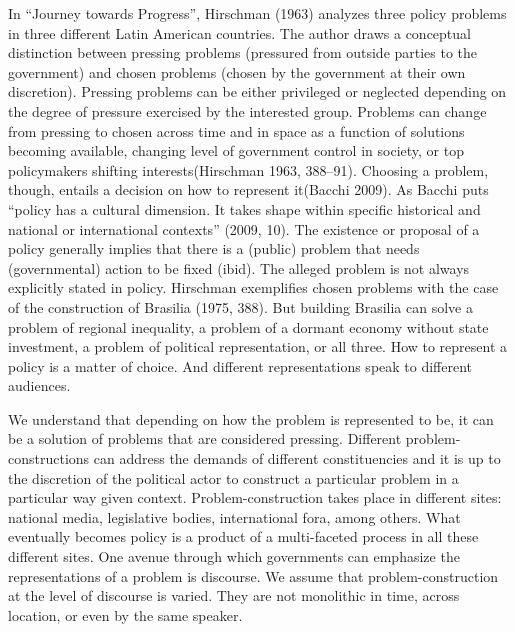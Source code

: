 \documentclass[
]{article}
\begin{document}
In ``Journey towards Progress'', Hirschman (1963) analyzes three policy
problems in three different Latin American countries. The author draws a
conceptual distinction between pressing problems (pressured from outside
parties to the government) and chosen problems (chosen by the government
at their own discretion). Pressing problems can be either privileged or
neglected depending on the degree of pressure exercised by the
interested group. Problems can change from pressing to chosen across
time and in space as a function of solutions becoming available,
changing level of government control in society, or top policymakers
shifting interests(Hirschman 1963, 388--91). Choosing a problem, though,
entails a decision on how to represent it(Bacchi 2009). As Bacchi puts
``policy has a cultural dimension. It takes shape within specific
historical and national or international contexts'' (2009, 10). The
existence or proposal of a policy generally implies that there is a
(public) problem that needs (governmental) action to be fixed (ibid).
The alleged problem is not always explicitly stated in policy. Hirschman
exemplifies chosen problems with the case of the construction of
Brasilia (1975, 388). But building Brasilia can solve a problem of
regional inequality, a problem of a dormant economy without state
investment, a problem of political representation, or all three. How to
represent a policy is a matter of choice. And different representations
speak to different audiences.

We understand that depending on how the problem is represented to be, it
can be a solution of problems that are considered pressing. Different
problem-constructions can address the demands of different
constituencies and it is up to the discretion of the political actor to
construct a particular problem in a particular way given context.
Problem-construction takes place in different sites: national media,
legislative bodies, international fora, among others. What eventually
becomes policy is a product of a multi-faceted process in all these
different sites. One avenue through which governments can emphasize the
representations of a problem is discourse. We assume that
problem-construction at the level of discourse is varied. They are not
monolithic in time, across location, or even by the same speaker.
\end{document}
